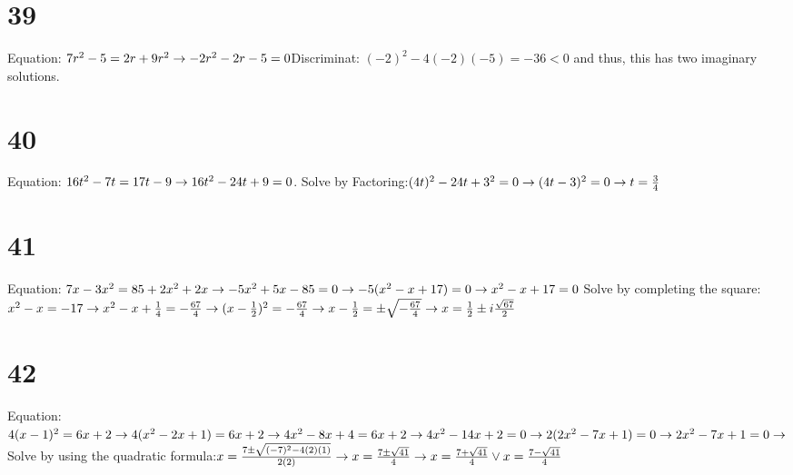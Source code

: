 \documentclass{article}
\theoremstyle{definition}
\begin{document}
\section*{39}
Equation: $7r^2-5=2r+9r^2\newline\rightarrow -2r^2-2r-5=0$\newline Discriminat: $(-2)^2-4(-2)(-5)=-36<0$ and thus, this has two imaginary solutions.

\section*{40}
Equation: $16t^2-7t=17t-9\newline\rightarrow 16t^2-24t+9=0$. Solve by Factoring:\newline $(4t)^2-24t+3^2=0\newline\rightarrow (4t-3)^2=0\newline\rightarrow 
t=\frac{3}{4}$

\section*{41}
Equation: $7x-3x^2=85+2x^2+2x\newline\rightarrow -5x^2+5x-85=0\newline\rightarrow -5(x^2-x+17)=0\newline\rightarrow x^2-x+17=0$ Solve by 
completing the square:\newline $x^2-x=-17\newline\rightarrow x^2-x+\frac{1}{4}=-\frac{67}{4}\newline\rightarrow (x-\frac{1}{2})^2=-\frac{67}{4}\newline
\rightarrow x-\frac{1}{2}=\pm\sqrt{-\frac{67}{4}}\newline\rightarrow x=\frac{1}{2}\pm i\frac{\sqrt{67}}{2}$

\section*{42}
Equation: $4(x-1)^2=6x+2\newline\rightarrow 4(x^2-2x+1)=6x+2\newline\rightarrow 4x^2-8x+4=6x+2\newline\rightarrow 4x^2-14x+2=0\newline\rightarrow 
2(2x^2-7x+1)=0\newline\rightarrow 2x^2-7x+1=0\newline\rightarrow$ Solve by using the quadratic formula:\newline $x=\frac{7\pm\sqrt{(-7)^2-4(2)(1)}}{2(2)}
\newline\rightarrow x=\frac{7\pm\sqrt{41}}{4}\newline\rightarrow x=\frac{7+\sqrt{41}}{4}\vee x=\frac{7-\sqrt{41}}{4}$
\end{document}
